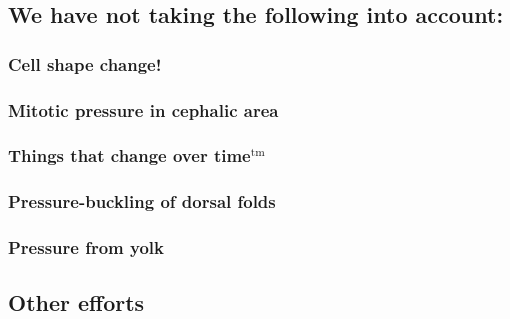 \subsection{We have not taking the following into account:}
\subsubsection{Cell shape change!}
\subsubsection{Mitotic pressure in cephalic area}
\subsubsection{Things that change over time$^{\text{tm}}$}
\subsubsection{Pressure-buckling of dorsal folds}
\subsubsection{Pressure from yolk}
\subsection{Other efforts}
